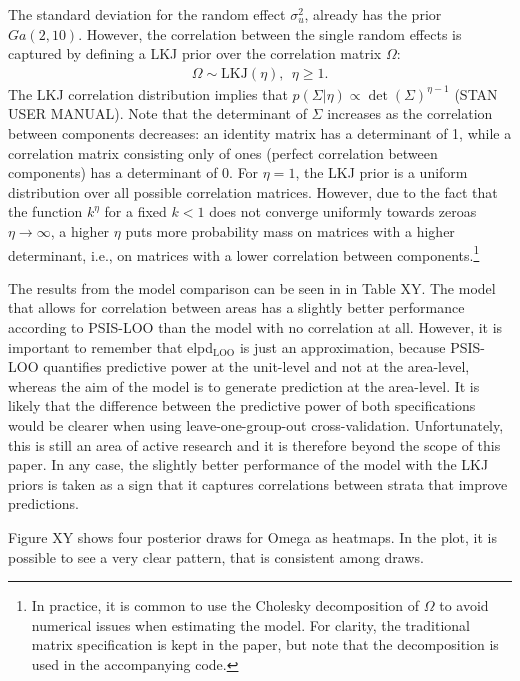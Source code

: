 The standard deviation for the random effect $\sigma_u^2$, already has the prior $Ga(2, 10)$.
However, the correlation between the single random effects is captured by defining a LKJ prior over the correlation matrix $\Omega$:
\begin{gather*}
    \Omega \sim \text{LKJ}(\eta), ~~ \eta \ge 1.
\end{gather*}
The LKJ correlation distribution implies that $p(\Sigma|\eta) \propto \det(\Sigma)^{\eta - 1}$ (STAN USER MANUAL).
Note that the determinant of $\Sigma$ increases as the correlation between components decreases:
an identity matrix has a determinant of 1, while a correlation matrix consisting only of ones (perfect correlation between components) has a determinant of 0.
For $\eta = 1$, the LKJ prior is a uniform distribution over all possible correlation matrices.
However, due to the fact that the function $k^\eta$ for a fixed $k < 1$ does not converge uniformly towards zeroas $\eta \rightarrow \infty$, a higher $\eta$ puts more probability mass on matrices with a higher determinant, i.e., on matrices with a lower correlation between components.\footnote{In practice, it is common to use the Cholesky decomposition of $\Omega$ to avoid numerical issues when estimating the model.
For clarity, the traditional matrix specification is kept in the paper, but note that the decomposition is used in the accompanying code.}

The results from the model comparison can be seen in in Table XY.
The model that allows for correlation between areas has a slightly better performance according to PSIS-LOO than the model with no correlation at all.
However, it is important to remember that elpd$_{\text{LOO}}$ is just an approximation, because PSIS-LOO quantifies predictive power at the unit-level and not at the area-level, whereas the aim of the model is to generate prediction at the area-level.
It is likely that the difference between the predictive power of both specifications would be clearer when using leave-one-group-out cross-validation.
Unfortunately, this is still an area of active research and it is therefore beyond the scope of this paper.
In any case, the slightly better performance of the model with the LKJ priors is taken as a sign that it captures correlations between strata that improve predictions.

Figure XY shows four posterior draws for Omega as heatmaps. In the plot, it is possible to see a very clear pattern, that is consistent among draws.








